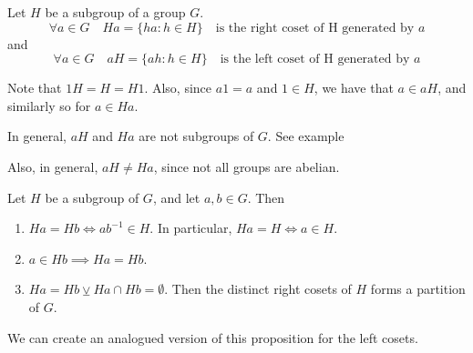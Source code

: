 \begin{defn}[Coset]
\label{defn:coset}
  Let $H$ be a subgroup of a group $G$.
  \begin{equation*}
    \forall a \in G \quad Ha = \{ha : h \in H\} \quad \text{is the right coset of H generated by } a
  \end{equation*}
  and
  \begin{equation*}
    \forall a \in G \quad aH = \{ah : h \in H\} \quad \text{is the left coset of H generated by } a
  \end{equation*}
\end{defn}

\begin{note}
  Note that $1H = H = H1$. Also, since $a1 = a$ and $1 \in H$, we have that $a \in aH$, and similarly so for $a \in Ha$.

  In general, $aH$ and $Ha$ are not subgroups of $G$. See example

  Also, in general, $aH \neq Ha$, since not all groups are abelian.
\end{note}

\begin{propo}
\label{propo:properties_of_cosets}
  Let $H$ be a subgroup of $G$, and let $a, b \in G$. Then
  \begin{enumerate}
    \item $Ha = Hb \iff ab^{-1} \in H$. In particular, $Ha = H \iff a \in H$.
    \item $a \in Hb \implies Ha = Hb$.
    \item $Ha = Hb \veebar Ha \cap Hb = \emptyset$. Then the distinct right cosets of $H$ forms a partition of $G$.
  \end{enumerate}
  We can create an analogued version of this proposition for the left cosets.
\end{propo}

